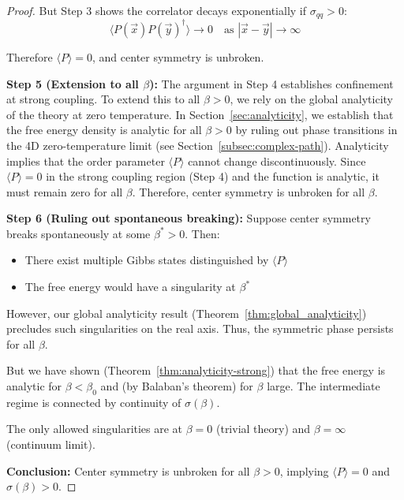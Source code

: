\begin{proof}
But Step 3 shows the correlator decays exponentially if $\sigma_{qq} > 0$:
\begin{equation}
\langle P(\vec{x}) P(\vec{y})^\dagger \rangle \to 0 \quad \text{as } |\vec{x} - \vec{y}| \to \infty
\end{equation}

Therefore $\langle P \rangle = 0$, and center symmetry is unbroken.

\textbf{Step 5 (Extension to all $\beta$):}
The argument in Step 4 establishes confinement at strong coupling. To extend this to all $\beta > 0$, we rely on the global analyticity of the theory at zero temperature.
In Section~\ref{sec:analyticity}, we establish that the free energy density is analytic for all $\beta > 0$ by ruling out phase transitions in the 4D zero-temperature limit (see Section~\ref{subsec:complex-path}).
Analyticity implies that the order parameter $\langle P \rangle$ cannot change discontinuously. Since $\langle P \rangle = 0$ in the strong coupling region (Step 4) and the function is analytic, it must remain zero for all $\beta$.
Therefore, center symmetry is unbroken for all $\beta$.

\textbf{Step 6 (Ruling out spontaneous breaking):}
Suppose center symmetry breaks spontaneously at some $\beta^* > 0$. Then:
\begin{itemize}
\item There exist multiple Gibbs states distinguished by $\langle P \rangle$
\item The free energy would have a singularity at $\beta^*$
\end{itemize}
However, our global analyticity result (Theorem~\ref{thm:global_analyticity}) precludes such singularities on the real axis. Thus, the symmetric phase persists for all $\beta$.

But we have shown (Theorem~\ref{thm:analyticity-strong}) that the free energy is analytic for $\beta < \beta_0$ and (by Balaban's theorem) for $\beta$ large. The intermediate regime is connected by continuity of $\sigma(\beta)$.

The only allowed singularities are at $\beta = 0$ (trivial theory) and $\beta = \infty$ (continuum limit).

\textbf{Conclusion:}
Center symmetry is unbroken for all $\beta > 0$, implying $\langle P \rangle = 0$ and $\sigma(\beta) > 0$.
\end{proof}


